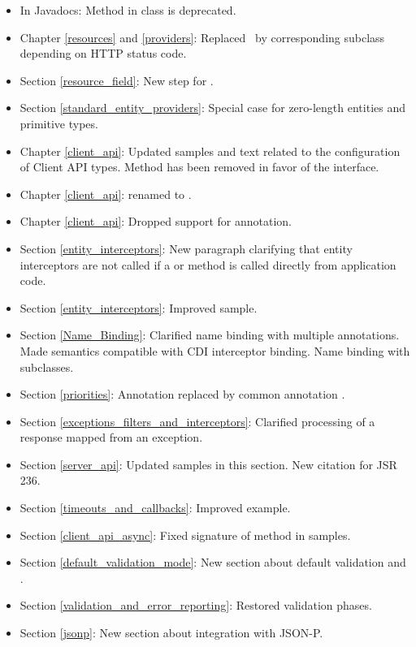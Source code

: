 \begin{itemize}
\item In Javadocs: Method  in class  is deprecated.
\item Chapter \ref{resources} and \ref{providers}: Replaced \WebAppExc\ by corresponding subclass depending on HTTP status code.
\item Section \ref{resource_field}: New step for . 
\item Section \ref{standard_entity_providers}: Special case for zero-length entities and primitive types.
\item Chapter \ref{client_api}: Updated samples and text related to the configuration of Client API types. Method  has been removed in favor of the  interface.
\item Chapter \ref{client_api}:  renamed to .
\item Chapter \ref{client_api}: Dropped support for  annotation.
\item Section \ref{entity_interceptors}: New paragraph clarifying that entity interceptors are not called if a  or  method is called directly from application code.
\item Section \ref{entity_interceptors}: Improved  sample.
\item Section \ref{Name_Binding}: Clarified name binding with multiple annotations. Made semantics compatible with CDI interceptor binding. Name binding with  subclasses.
\item Section \ref{priorities}: Annotation  replaced by common annotation .
\item Section \ref{exceptions_filters_and_interceptors}: Clarified processing of a response mapped from an exception.
\item Section \ref{server_api}: Updated samples in this section. New citation for JSR 236.
\item Section \ref{timeouts_and_callbacks}: Improved example.
\item Section \ref{client_api_async}: Fixed signature of method  in samples.
\item Section \ref{default_validation_mode}: New section about default validation and .
\item Section \ref{validation_and_error_reporting}: Restored validation phases.
\item Section \ref{jsonp}: New section about integration with JSON-P.

\end{itemize}

